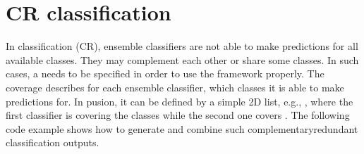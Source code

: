 \documentclass[letterpaper,10pt,english]{sphinxmanual}
\begin{document}
\section{CR classification}
\label{\detokenize{usage_and_examples:cr-classification}}
\sphinxAtStartPar
In  classification (CR), ensemble classifiers are not able to make predictions for all
available classes. They may complement each other or share some classes. In such cases, a  needs to be
specified in order to use the framework properly. The coverage describes for each ensemble classifier, which classes
it is able to make predictions for. In pusion, it can be defined by a simple 2D list, e.g., \sphinxcode{\sphinxupquote{{[}{[}0,1{]}, {[}0,2,3{]}{]}}}, where
the first classifier is covering the classes  while the second one covers .
The following code example shows how to generate and combine such complementary\sphinxhyphen{}redundant classification outputs.
\end{document}
